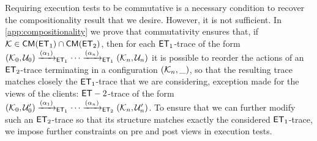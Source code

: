Requiring execution tests to be commutative is a necessary condition to recover 
the compositionality result that we desire. However, it is not sufficient. 
In \cref{app:compositionality} we prove that commutativity ensures that, 
if $\mathcal{K} \in \mathsf{CM}(\mathsf{ET}_1) \cap \mathsf{CM}(\mathsf{ET}_2)$, then for each 
$\mathsf{ET}_1$-trace of the form $(\mathcal{K}_{0}, \mathcal{U}_{0}) \xrightarrow{(\alpha_{1})}_{\mathsf{ET}_1} \cdots 
\xrightarrow{(\alpha_{n})}_{\mathsf{ET}_1} (\mathcal{K}_{n}, \mathcal{U}_{n})$ it is possible to reorder the actions of 
an $\mathsf{ET}_2$-trace terminating in a configuration $(\mathcal{K}_{n}, \_)$, so that the resulting trace matches 
closely the $\mathsf{ET}_1$-trace that we are considering, exception made for the views of the clients: 
$\mathsf{ET}-2$-trace of the form$(\mathcal{K}_{0}, \mathcal{U}'_{0}) \xrightarrow{(\alpha_{1})}_{\mathsf{ET}_1} \cdots 
\xrightarrow{(\alpha_{n})}_{\mathsf{ET}_2} (\mathcal{K}_{n}, \mathcal{U}'_{n})$. To ensure that we can further modify 
such an $\mathsf{ET}_2$-trace so that its structure matches exactly the considered $\mathsf{ET}_1$-trace, we 
impose further constraints on pre and post views  in execution tests.
